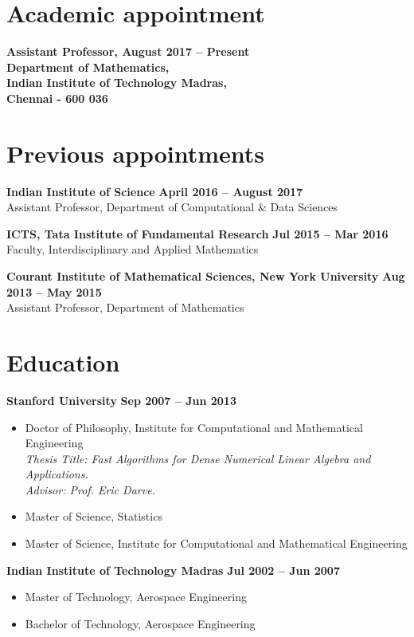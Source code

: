 \documentclass[margin,line]{resume}
\begin{document}

\begin{resume}
\section{\mysidestyle Academic appointment}
\textbf{Assistant Professor, \hfill \textbf{August 2017 -- Present}\\
Department of Mathematics,\\
Indian Institute of Technology Madras,\\
Chennai - 600 036}
	\section{\mysidestyle Previous appointments}
	
	\textbf{Indian Institute of Science} \hfill \textbf{April 2016 -- August 2017}\\
	Assistant Professor, Department of Computational \& Data Sciences
	
	\textbf{ICTS, Tata Institute of Fundamental Research} \hfill \textbf{Jul 2015 -- Mar 2016}\\
	Faculty, Interdisciplinary and Applied Mathematics

	\textbf{Courant Institute of Mathematical Sciences, New York University} \hfill \textbf{Aug 2013 -- May 2015}\\
	Assistant Professor, Department of Mathematics

	\section{\mysidestyle Education}
	\textbf{Stanford University} \hfill \textbf{Sep 2007 -- Jun 2013}
	\begin{itemize}
	\item	Doctor of Philosophy, Institute for Computational and Mathematical Engineering\\
	\emph{Thesis Title: Fast Algorithms for Dense Numerical Linear Algebra and Applications.}\\
	\emph{Advisor: Prof. Eric Darve.}
	\item	Master of Science, Statistics
	\item	Master of Science, Institute for Computational and Mathematical Engineering
	\end{itemize}
	\textbf{Indian Institute of Technology Madras} \hfill \textbf{Jul 2002 -- Jun 2007}
	\begin{itemize}
	\item	Master of Technology, Aerospace Engineering
	\item	Bachelor of Technology, Aerospace Engineering
	\end{itemize}
	\vspace{-3 mm}


\end{resume}
\end{document}
